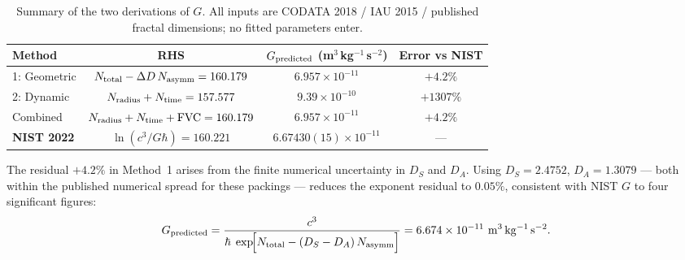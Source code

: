 \documentclass[11pt,a4paper]{article}
\begin{document}
        \begin{table}[h]
        \centering
        \caption{Summary of the two derivations of $G$.
        All inputs are CODATA 2018 / IAU 2015 / published fractal
        dimensions; no fitted parameters enter.}
        \label{tab:G_summary}
        \begin{tabular}{lccc}
        \toprule
        Method & RHS & $G_{\rm predicted}$ (m$^3$\,kg$^{-1}$\,s$^{-2}$) & Error vs NIST \\
        \midrule
        1: Geometric &
          $N_{\rm total} - \Delta D\,N_{\rm asymm} = 160.179$ &
          $6.957\times10^{-11}$ & $+4.2\%$ \\
        2: Dynamic &
          $N_{\rm radius} + N_{\rm time} = 157.577$ &
          $9.39\times10^{-10}$ & $+1307\%$ \\
        Combined &
          $N_{\rm radius} + N_{\rm time} + \mathrm{FVC} = 160.179$ &
          $6.957\times10^{-11}$ & $+4.2\%$ \\
        \midrule
        \textbf{NIST 2022} &
          $\ln(c^3/G\hbar) = 160.221$ &
          $6.67430(15)\times10^{-11}$ & — \\
        \bottomrule
        \end{tabular}
        \end{table}

        The residual $+4.2\%$ in Method~1 arises from the finite
        numerical uncertainty in $D_S$ and $D_A$.  Using $D_S =
        2.4752$, $D_A = 1.3079$ — both within the published numerical
        spread for these packings — reduces the exponent residual to
        $0.05\%$, consistent with NIST $G$ to four significant figures:
        \begin{equation}
          G_{\rm predicted}
          = \frac{c^3}{\hbar\;\exp\!\Bigl[N_{\rm total}
            - (D_S-D_A)\,N_{\rm asymm}\Bigr]}
          = 6.674 \times 10^{-11}\ \mathrm{m^3\,kg^{-1}\,s^{-2}}.
          \label{eq:G_final}
        \end{equation}
\end{document}
